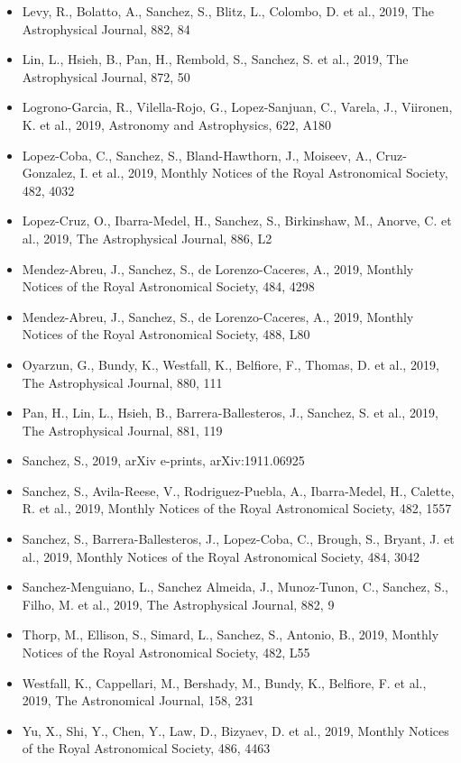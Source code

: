 \documentclass{letter}
\begin{document}
\begin{enumerate}
\begin{itemize}
\item Levy, R., Bolatto, A., Sanchez, S., Blitz, L., Colombo, D. et al., 2019, The Astrophysical Journal, 882, 84
\item Lin, L., Hsieh, B., Pan, H., Rembold, S., Sanchez, S. et al., 2019, The Astrophysical Journal, 872, 50
\item Logrono-Garcia, R., Vilella-Rojo, G., Lopez-Sanjuan, C., Varela, J., Viironen, K. et al., 2019, Astronomy and Astrophysics, 622, A180
\item Lopez-Coba, C., Sanchez, S., Bland-Hawthorn, J., Moiseev, A., Cruz-Gonzalez, I. et al., 2019, Monthly Notices of the Royal Astronomical Society, 482, 4032
\item Lopez-Cruz, O., Ibarra-Medel, H., Sanchez, S., Birkinshaw, M., Anorve, C. et al., 2019, The Astrophysical Journal, 886, L2
\item Mendez-Abreu, J., Sanchez, S., de Lorenzo-Caceres, A., 2019, Monthly Notices of the Royal Astronomical Society, 484, 4298
\item Mendez-Abreu, J., Sanchez, S., de Lorenzo-Caceres, A., 2019, Monthly Notices of the Royal Astronomical Society, 488, L80
\item Oyarzun, G., Bundy, K., Westfall, K., Belfiore, F., Thomas, D. et al., 2019, The Astrophysical Journal, 880, 111
\item Pan, H., Lin, L., Hsieh, B., Barrera-Ballesteros, J., Sanchez, S. et al., 2019, The Astrophysical Journal, 881, 119
\item Sanchez, S., 2019, arXiv e-prints, arXiv:1911.06925
\item Sanchez, S., Avila-Reese, V., Rodriguez-Puebla, A., Ibarra-Medel, H., Calette, R. et al., 2019, Monthly Notices of the Royal Astronomical Society, 482, 1557
\item Sanchez, S., Barrera-Ballesteros, J., Lopez-Coba, C., Brough, S., Bryant, J. et al., 2019, Monthly Notices of the Royal Astronomical Society, 484, 3042
\item Sanchez-Menguiano, L., Sanchez Almeida, J., Munoz-Tunon, C., Sanchez, S., Filho, M. et al., 2019, The Astrophysical Journal, 882, 9
\item Thorp, M., Ellison, S., Simard, L., Sanchez, S., Antonio, B., 2019, Monthly Notices of the Royal Astronomical Society, 482, L55
\item Westfall, K., Cappellari, M., Bershady, M., Bundy, K., Belfiore, F. et al., 2019, The Astronomical Journal, 158, 231
\item Yu, X., Shi, Y., Chen, Y., Law, D., Bizyaev, D. et al., 2019, Monthly Notices of the Royal Astronomical Society, 486, 4463

\end{itemize}
\end{enumerate}
\end{document}
